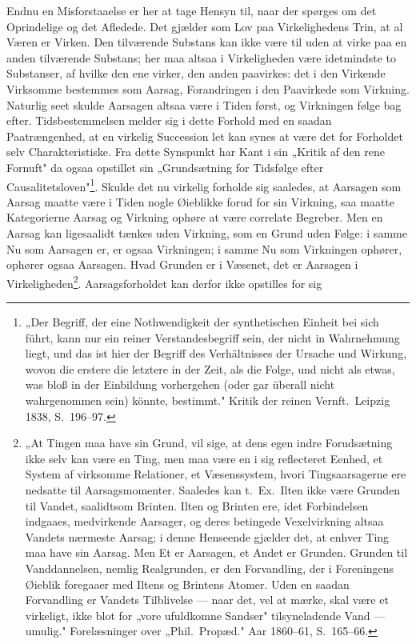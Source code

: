 \documentclass[12pt]{book}
\newcommand{\opage}[1]{\marginnote{\footnotesize\textit{[#1]}}}
\begin{document}
Endnu en Misforstaaelse er her at tage Hensyn til, naar der spørges om det Oprindelige og
det Afledede. Det gjælder som Lov paa Virkelighedens Trin, at al Væren er Virken. Den
tilværende Substans kan ikke være til uden at virke paa en anden tilværende Substans; her
maa altsaa i Virkeligheden være idetmindste to Substanser, af hvilke den ene virker, den
anden paavirkes: det i den Virkende Virksomme bestemmes som Aarsag, Forandringen i den
Paavirkede som Virkning. Naturlig seet skulde Aarsagen altsaa være i Tiden først, og
Virkningen følge bag efter. Tidsbestemmelsen melder sig i dette Forhold med en saadan
Paatrængenhed, at en virkelig Succession let kan synes at være det for Forholdet selv
Charakteristiske. Fra dette Synspunkt har Kant i sin „Kritik af den rene Fornuft" da
ogsaa opstillet sin „Grundsætning for Tidsfølge efter
Causalitetsloven"\footnote{„Der Begriff, der eine Nothwendigkeit der synthetischen
Einheit bei sich führt, kann nur ein reiner Verstandesbegriff sein, der nicht in
Wahrnehmung liegt, und das ist hier der Begriff des Verhältnisses der Ursache und
Wirkung, wovon die erstere die letztere in der Zeit, als die Folge, und nicht als etwas,
was bloß in der Einbildung vorhergehen (oder gar überall nicht wahrgenommen sein) könnte,
bestimmt." Kritik der reinen Vernft.\ Leipzig 1838, S.~196--97.}. Skulde det nu virkelig
forholde sig saaledes, at Aarsagen som Aarsag maatte være i Tiden nogle Øieblikke forud
for sin Virkning, saa maatte Kategorierne Aarsag og Virkning ophøre at være correlate
Begreber. Men en Aarsag kan ligesaalidt tænkes uden Virkning, som en Grund uden Følge: i
samme Nu som Aarsagen er, er ogsaa Virkningen; i samme Nu som Virkningen ophører, ophører
ogsaa Aarsagen. Hvad Grunden er
\opage{118} i Væsenet, det er Aarsagen i Virkeligheden\footnote{„At Tingen maa have sin Grund, vil
sige, at dens egen indre Forudsætning ikke selv kan være en Ting, men maa være en i sig
reflecteret Eenhed, et System af virksomme Relationer, et Væsenssystem, hvori
Tingsaarsagerne ere nedsatte til Aarsagsmomenter. Saaledes kan t.\ Ex.\ Ilten ikke være
Grunden til Vandet, saalidtsom Brinten. Ilten og Brinten ere, idet Forbindelsen indgaaes,
medvirkende Aarsager, og deres betingede Vexelvirkning altsaa Vandets nærmeste Aarsag; i
denne Henseende gjælder det, at enhver Ting maa have sin Aarsag. Men Et er Aarsagen, et
Andet er Grunden. Grunden til Vanddannelsen, nemlig Realgrunden, er den Forvandling, der
i Foreningens Øieblik foregaaer med Iltens og Brintens Atomer. Uden en saadan Forvandling
er Vandets Tilblivelse --- naar det, vel at mærke, skal være et virkeligt, ikke blot for
„vore ufuldkomne Sandser" tilsyneladende Vand --- umulig." Forelæsninger over „Phil.\
Propæd." Aar 1860--61, S.~165--66.}. Aarsagsforholdet kan derfor ikke opstilles for sig
\end{document}
